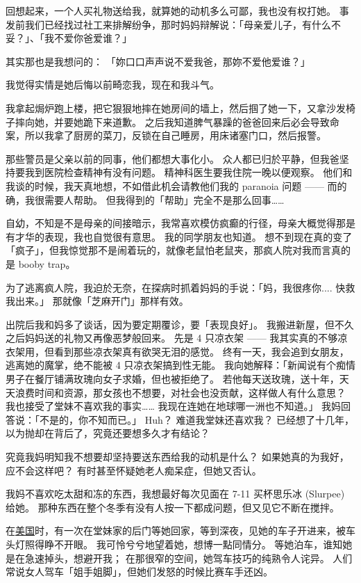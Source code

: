 \documentclass[12pt]{report}
\begin{document}
回想起来，一个人买礼物送给我，就算她的动机多么可鄙，我也没有权打她。 事发前我们已经找过社工来排解纷争，那时妈妈辩解说：「母亲爱儿子，有什么不妥？」、「我不爱你爸爱谁？」

其实那也是我想问的： 「妳口口声声说不爱我爸，那妳不爱他爱谁？」

我觉得实情是她后悔以前畸恋我，现在和我斗气。

我拿起焗炉跑上楼，把它狠狠地摔在她房间的墙上，然后掴了她一下，又拿沙发椅子摔向她，并要她跪下来道歉。 之后我知道脾气暴躁的爸爸回来后必会导致命案，所以我拿了厨房的菜刀，反锁在自己睡房，用床诸塞门口，然后报警。

那些警员是父亲以前的同事，他们都想大事化小。 众人都已归於平静，但我爸坚持要我到医院检查精神有没有问题。 精神科医生要我住院一晚以便观察。 他们和我谈的时候，我天真地想，不如借此机会请教他们我的 paranoia 问题 —— 而的确，我很需要人帮助。 但我得到的「帮助」完全不是那么回事……

自幼，不知是不是母亲的间接暗示，我常喜欢模仿疯癫的行径，母亲大概觉得那是有才华的表现，我也自觉很有意思。 我的同学朋友也知道。 想不到现在真的变了「疯子」，但我惊觉那不是闹着玩的，就像老鼠怕老鼠夹，那疯人院对我而言真的是 booby trap。

为了逃离疯人院，我迫於无奈，在探病时抓着妈妈的手说：「妈，我很疼你.... 快救我出来。」 那就像「芝麻开门」那样有效。

出院后我和妈多了谈话，因为要定期覆诊，要「表现良好」。 我搬进新屋，但不久之后妈妈送的礼物又再像恶梦般回来。 先是 4 只凉衣架 —— 我其实真的不够凉衣架用，但看到那些凉衣架真有欲哭无泪的感觉。 终有一天，我会追到女朋友，逃离她的魔掌，绝不能被 4 只凉衣架搞到性无能。 我向她解释：「新闻说有个痴情男子在餐厅铺满玫瑰向女子求婚，但也被拒绝了。 若他每天送玫瑰，送十年，天天浪费时间和资源，那女孩也不想要，对社会也没贡献，这样做人有什么意思？ 我也接受了堂妹不喜欢我的事实…… 我现在连她在地球哪一洲也不知道。」 我妈回答说：「不是的，你不知而已。」 Huh？ 难道我堂妹还喜欢我？ 已经想了十几年，以为抛却在背后了，究竟还要想多久才有结论？

究竟我妈明知我不想要却坚持要送东西给我的动机是什么？ 如果她真的为我好，应不会这样吧？ 有时甚至怀疑她老人痴呆症，但她又否认。

我妈不喜欢吃太甜和冻的东西，我想最好每次见面在 7-11 买杯思乐冰 (Slurpee) 给她。 那种东西在整个冬季有没有人按一下都成问题，但又见它不断在搅拌。

在\underline{美国}时，有一次在堂妹家的后门等她回家，等到深夜，见她的车子开进来，被车头灯照得睁不开眼。 我可怜兮兮地望着她，想博一點同情分。 等她泊车，谁知她是在急速掉头，想避开我； 在那很窄的空间，她驾车技巧的纯熟令人诧异。 人们常说女人驾车「姐手姐脚」，但她们发怒的时候比赛车手还凶。
\end{document}
